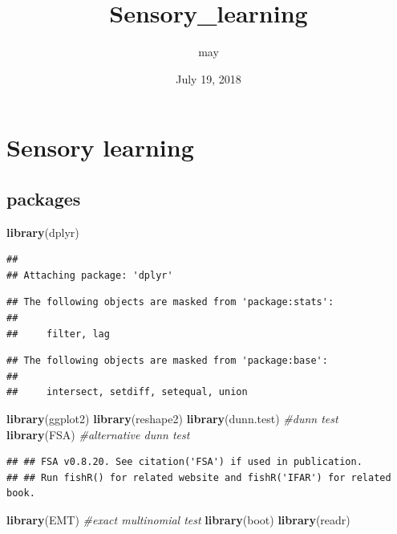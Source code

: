 \documentclass[]{article}
\title{Sensory\_learning}
\author{may}
\date{July 19, 2018}
\newenvironment{Shaded}{\begin{snugshade}}{\end{snugshade}}
\newcommand{\KeywordTok}[1]{\textcolor[rgb]{0.13,0.29,0.53}{\textbf{{#1}}}}
\newcommand{\CommentTok}[1]{\textcolor[rgb]{0.56,0.35,0.01}{\textit{{#1}}}}
\newcommand{\NormalTok}[1]{{#1}}
\begin{document}
\maketitle

\section{Sensory learning}\label{sensory-learning}

\subsection{packages}\label{packages}

\begin{Shaded}
\begin{Highlighting}[]
\KeywordTok{library}\NormalTok{(dplyr)}
\end{Highlighting}
\end{Shaded}

\begin{verbatim}
## 
## Attaching package: 'dplyr'
\end{verbatim}

\begin{verbatim}
## The following objects are masked from 'package:stats':
## 
##     filter, lag
\end{verbatim}

\begin{verbatim}
## The following objects are masked from 'package:base':
## 
##     intersect, setdiff, setequal, union
\end{verbatim}

\begin{Shaded}
\begin{Highlighting}[]
\KeywordTok{library}\NormalTok{(ggplot2)}
\KeywordTok{library}\NormalTok{(reshape2)}
\KeywordTok{library}\NormalTok{(dunn.test) }\CommentTok{#dunn test}
\KeywordTok{library}\NormalTok{(FSA) }\CommentTok{#alternative dunn test}
\end{Highlighting}
\end{Shaded}

\begin{verbatim}
## ## FSA v0.8.20. See citation('FSA') if used in publication.
## ## Run fishR() for related website and fishR('IFAR') for related book.
\end{verbatim}

\begin{Shaded}
\begin{Highlighting}[]
\KeywordTok{library}\NormalTok{(EMT) }\CommentTok{#exact multinomial test}
\KeywordTok{library}\NormalTok{(boot)}
\KeywordTok{library}\NormalTok{(readr)}
\end{Highlighting}
\end{Shaded}
\end{document}
